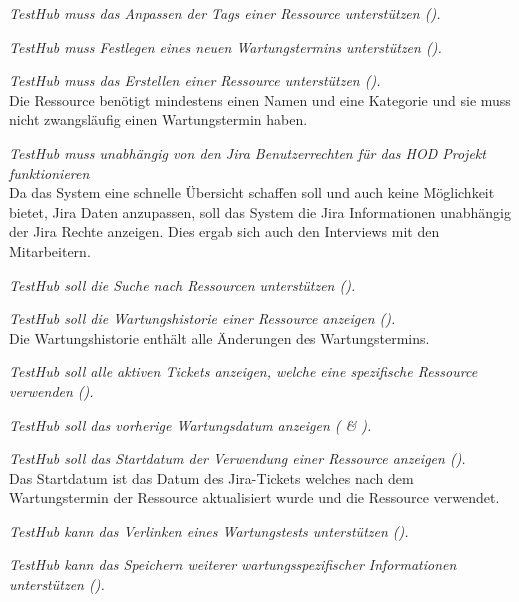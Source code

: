 \begin{description}
    \textit{TestHub muss das Anpassen der Tags einer Ressource unterstützen 
    ().}

    \textit{TestHub muss Festlegen eines neuen Wartungstermins unterstützen 
    ().}

    \textit{TestHub muss das Erstellen einer Ressource unterstützen 
    ().}\\
    Die Ressource benötigt mindestens einen Namen und eine Kategorie und sie muss nicht zwangsläufig 
    einen Wartungstermin haben.

    \textit{TestHub muss unabhängig von den Jira Benutzerrechten für das HOD Projekt funktionieren}\\
    Da das System eine schnelle Übersicht schaffen soll und auch keine Möglichkeit
    bietet, Jira Daten anzupassen, soll das System die Jira Informationen unabhängig der Jira Rechte anzeigen.
    Dies ergab sich auch den Interviews mit den Mitarbeitern.



    \textit{TestHub soll die Suche nach Ressourcen unterstützen ().}

    \textit{TestHub soll die Wartungshistorie einer Ressource anzeigen ().}\\
    Die Wartungshistorie enthält alle Änderungen des Wartungstermins.

    \textit{TestHub soll alle aktiven Tickets anzeigen, welche eine spezifische 
    Ressource verwenden ().}

    \textit{TestHub soll das vorherige Wartungsdatum anzeigen ( \& ).}
    
    \textit{TestHub soll das Startdatum der Verwendung einer Ressource anzeigen ().}\\
    Das Startdatum ist das Datum des Jira-Tickets welches nach dem Wartungstermin 
    der Ressource aktualisiert wurde und die Ressource verwendet.


    \textit{TestHub kann das Verlinken eines Wartungstests unterstützen 
    ().}

    \textit{TestHub kann das Speichern weiterer wartungsspezifischer Informationen unterstützen 
    ().}

\end{description}

